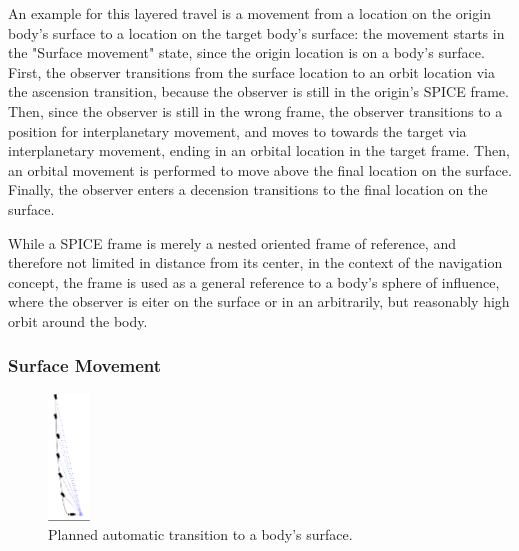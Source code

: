 An example for this layered travel is a movement from a location on the origin body's surface to a location on the
target body's surface:
the movement starts in the "Surface movement" state, since the origin location is on a body's surface.
First, the observer transitions from the surface location to an orbit location via the ascension transition, because
the observer is still in the origin's SPICE frame.
Then, since the observer is still in the wrong frame, the observer transitions to a position for interplanetary
movement, and moves to towards the target via interplanetary movement, ending in an orbital location in the target
frame.
Then, an orbital movement is performed to move above the final location on the surface.
Finally, the observer enters a decension transitions to the final location on the surface.

While a SPICE frame is merely a nested oriented frame of reference, and therefore not limited in distance from its
center, in the context of the navigation concept, the frame is used as a general reference to a body's sphere of
influence, where the observer is eiter on the surface or in an arbitrarily, but reasonably high orbit around the body.

\subsubsection{Surface Movement}\label{subsubsec:surface-movements}

\begin{figure}
    \centering
    \includegraphics[width=0.1\textwidth]{content/4_3_autoNavigation/img/PlannedLanding}
    \caption{Planned automatic transition to a body's surface.}
    \label{fig:new-auto-nav-descend}
\end{figure}

